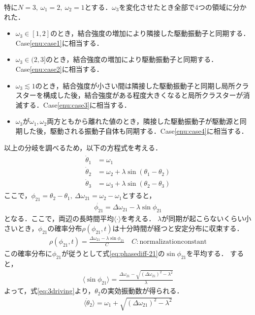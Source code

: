 \documentclass[../main]{subfiles}
\begin{document}
特に$N=3,\ \omega_1=2,\ \omega_2=1$とする．$\omega_3$を変化させたとき全部で4つの領域に分かれた．
\begin{itemize}
    \item $\omega_3\in[1,2]$のとき，結合強度の増加により隣接した駆動振動子と同期する．Case\ref{enu:case1}に相当する．
    \item $\omega_3\in(2,3]$のとき，結合強度の増加により駆動振動子と同期する．Case\ref{enu:case2}に相当する．
    \item $\omega_3\lesssim 1$のとき，結合強度が小さい間は隣接した駆動振動子と同期し局所クラスターを構成した後，結合強度がある程度大きくなると局所クラスターが消滅する．Case\ref{enu:case3}に相当する．
    \item $\omega_3$が$\omega_1,\omega_2$両方ともから離れた値のとき，隣接した駆動振動子が駆動源と同期した後，駆動される振動子自体も同期する．Case\ref{enu:case4}に相当する．
\end{itemize}
以上の分岐を調べるため，以下の方程式を考える．
\begin{align}
    \label{eq:3driving}
    \begin{split}
        \dot{\theta}_1&=\omega_1\\
        \dot{\theta}_2&=\omega_2+\lambda\sin(\theta_1-\theta_2)\\
        \dot{\theta}_3&=\omega_3+\lambda\sin(\theta_2-\theta_3)
    \end{split}
\end{align}
ここで，$\phi_{21}=\theta_2-\theta_1,\ \Delta\omega_{21}=\omega_2-\omega_1$とすると，
\begin{align}
    \label{eq:phasediff-21}
    \dot{\phi_{21}}=\Delta\omega_{21}-\lambda\sin\phi_{21}
\end{align}
となる．ここで，両辺の長時間平均$\langle\cdot\rangle$を考える．
$\lambda$が同期が起こらないくらい小さいとき，$\phi_{21}$の確率分布$\rho(\phi_{21},t)$は十分時間が経つと安定分布に収束する．
\begin{align*}
    \rho(\phi_{21},t)=\frac{\Delta\omega_{21}-\lambda\sin\phi_{21}}{C}\quad C:\mathrm{normalization constant}
\end{align*}
この確率分布に$\phi_{21}$が従うとして式\eqref{eq:phasediff-21}の$\sin\phi_{21}$を平均する．
すると，
\begin{align*}
    \langle\sin\phi_{21}\rangle=\frac{\Delta\omega_{21}-\sqrt{(\Delta\omega_{21})^2-\lambda^2}}{\lambda}
\end{align*}
よって，式\eqref{eq:3driving}より，$\theta_2$の実効振動数が得られる．
\begin{align*}
    \langle\dot{\theta}_2\rangle=\omega_1+\sqrt{(\Delta\omega_{21})^2-\lambda^2}
\end{align*}
\end{document}
